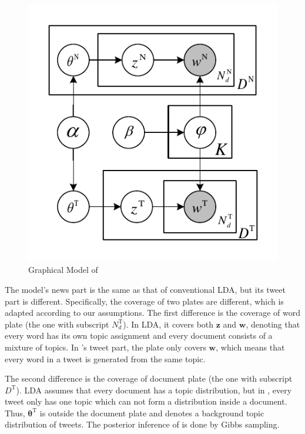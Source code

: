 \begin{figure}[h]
\centering
\includegraphics[width=.8\linewidth]{figures/stlda_model.pdf}
\caption{Graphical Model of \stlda}\label{fig:stlda}
\end{figure}

The model's news part is the same as that of conventional LDA, but its tweet part is different. Specifically, the coverage of two plates are different, which is adapted according to our assumptions. The first difference is the coverage of word plate (the one with subscript $N^\mathrm{T}_d$). In LDA, it covers both $\bm{z}$ and $\bm{w}$, denoting that every word has its own topic assignment and every document consists of a mixture of topics. In \stlda's tweet part, the plate only covers $\bm{w}$, which means that every word in a tweet is generated from the same topic.

The second difference is the coverage of document plate (the one with subscript $D^\mathrm{T}$). LDA assumes that every document has a topic distribution, but in \stlda, every tweet only has one topic which can not form a distribution inside a document. Thus, $\bm{\theta^\mathrm{T}}$ is outside the document plate and denotes a background topic distribution of tweets. The posterior inference of \stlda is done by Gibbs sampling.



